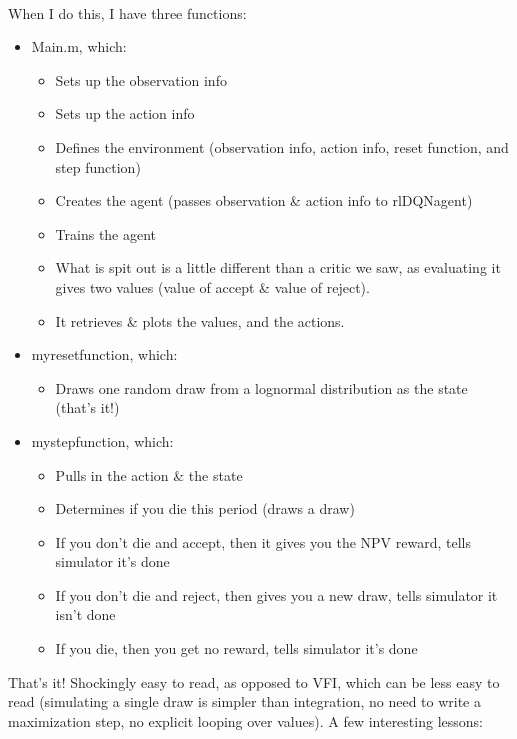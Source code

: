 \documentclass[11pt]{article}
\begin{document}
 \ \\
 When I do this, I have three functions:
 \begin{itemize}
 \item Main.m, which:
 \begin{itemize}
 \item Sets up the observation info
 \item Sets up the action info
 \item Defines the environment (observation info, action info, reset function, and step function)
 \item Creates the agent (passes observation \& action info to rlDQNagent)
 \item Trains the agent
 \item What is spit out is a little different than a critic we saw, as evaluating it gives two values (value of accept \& value of reject).
 \item It retrieves \& plots the values, and the actions.
 \end{itemize}
 \item myresetfunction, which:
 \begin{itemize}
 \item Draws one random draw from a lognormal distribution as the state (that's it!)
 \end{itemize}
 \item mystepfunction, which:
 \begin{itemize}
 \item Pulls in the action \& the state
 \item Determines if you die this period (draws a draw)
 \item If you don't die and accept, then it gives you the NPV reward, tells simulator it's done
 \item If you don't die and reject, then gives you a new draw, tells simulator it isn't done
 \item If you die, then you get no reward, tells simulator it's done
 \end{itemize}
 \end{itemize}
  That's it!  Shockingly easy to read, as opposed to VFI, which can be less easy to read (simulating a single draw is simpler than integration, no need to write a maximization step, no explicit looping over values).  A few interesting lessons:
\end{document}
